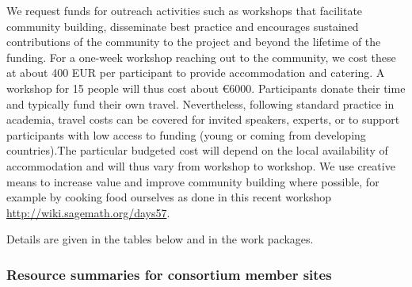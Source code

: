 \label{sect:budget-outreach-workshops}
We request funds for outreach activities such as workshops that
facilitate community building, disseminate best practice and
encourages sustained contributions of the community to the project and
beyond the lifetime of the funding. For  a one-week workshop reaching
out to the community, we cost these at about 400 EUR per participant
to provide accommodation and catering. A workshop for 15 people will
thus cost about \euro{6000}. Participants donate their time and typically fund their own travel.
Nevertheless, following standard practice in academia, travel costs can be
covered for invited speakers, experts, or to support participants with
low access to funding (young or coming from developing countries).The particular budgeted cost will 
depend on the local availability of accommodation and will thus vary from workshop to
workshop. We use creative means to increase value and improve
community building where possible, for example by cooking food
ourselves as done in this recent workshop
\href{http://wiki.sagemath.org/days57}{http://wiki.sagemath.org/days57}.

Details are given in the tables below and in the work packages.

\bigskip

\subsubsection{Resource summaries for consortium member sites}
\label{resources.summary}

